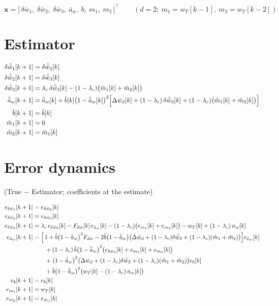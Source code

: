 \documentclass[11pt,a4paper,fontset=none]{ctexart}
\newcommand{\ba}{\bar{a}}
\newcommand{\bw}{\bar{w}}
\begin{document}
\begin{equation*}
\mathbf{x} = \bigl[\,\delta\bw_1,\ \delta\bw_2,\ \delta\bw_3,\ \ba_w,\ b,\ m_1,\ m_2\,\bigr]^{\top}
\qquad (d = 2;\ m_1 = w_T[k-1],\ m_2 = w_T[k-2])
\end{equation*}

\section{Estimator}

\begin{align*}
\delta\hat{\bw}_1[k+1] &= \delta\hat{\bw}_2[k] \\
\delta\hat{\bw}_2[k+1] &= \delta\hat{\bw}_3[k] \\
\delta\hat{\bw}_3[k+1] &= \lambda_c\,\delta\hat{\bw}_3[k]
  - (1-\lambda_c)\bigl(\hat{m}_1[k] + \hat{m}_2[k]\bigr) \\
\hat{\ba}_w[k+1]       &= \hat{\ba}_w[k]
  + \hat{b}[k]\bigl(1-\hat{\ba}_w[k]\bigr)^{2}
    \Bigl[\Delta\bw_d[k] + (1-\lambda_c)\,\delta\hat{\bw}_3[k]
    + (1-\lambda_c)\bigl(\hat{m}_1[k] + \hat{m}_2[k]\bigr)\Bigr] \\
\hat{b}[k+1]           &= \hat{b}[k] \\
\hat{m}_1[k+1]         &= 0 \\
\hat{m}_2[k+1]         &= \hat{m}_1[k]
\end{align*}

\section{Error dynamics}

(True $-$ Estimator; coefficients at the estimate)

\begin{align*}
e_{\delta\bw_1}[k+1] &= e_{\delta\bw_2}[k] \\
e_{\delta\bw_2}[k+1] &= e_{\delta\bw_3}[k] \\
e_{\delta\bw_3}[k+1] &= \lambda_c\,e_{\delta\bw_3}[k]
  - F_{dw}[k]\,e_{\ba_w}[k]
  - (1-\lambda_c)\bigl(e_{m_1}[k] + e_{m_2}[k]\bigr)
  - w_T[k] + (1-\lambda_c)\,n_w[k] \\
e_{\ba_w}[k+1] &= \Bigl[\,1
  + \hat{b}\bigl(1-\hat{\ba}_w\bigr)^{2}F_{dw}
  - 2\hat{b}\bigl(1-\hat{\ba}_w\bigr)
    \bigl(\Delta\bw_d + (1-\lambda_c)\delta\hat{\bw}_3
      + (1-\lambda_c)(\hat{m}_1 + \hat{m}_2)\bigr)\Bigr] e_{\ba_w}[k] \\
  &\qquad + (1-\lambda_c)\,\hat{b}\bigl(1-\hat{\ba}_w\bigr)^{2}
      \bigl(e_{\delta\bw_3}[k] + e_{m_1}[k] + e_{m_2}[k]\bigr) \\
  &\qquad + \bigl(1-\hat{\ba}_w\bigr)^{2}
      \bigl(\Delta\bw_d + (1-\lambda_c)\delta\hat{\bw}_3
      + (1-\lambda_c)(\hat{m}_1 + \hat{m}_2)\bigr) e_b[k] \\
  &\qquad + \hat{b}\bigl(1-\hat{\ba}_w\bigr)^{2}
      \bigl(w_T[k] - (1-\lambda_c)\,n_w[k]\bigr) \\
e_b[k+1] &= e_b[k] \\
e_{m_1}[k+1] &= w_T[k] \\
e_{m_2}[k+1] &= e_{m_1}[k]
\end{align*}
\end{document}
